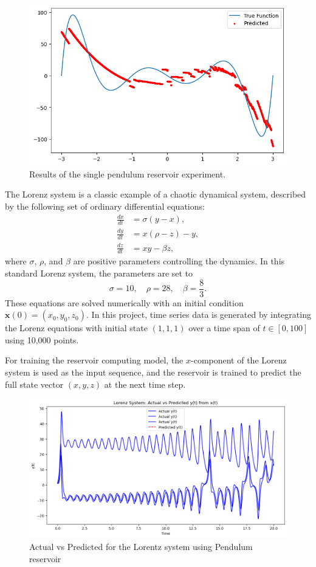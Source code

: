 \documentclass[numbered]{ivt-style/standard}
\begin{document}
\begin{figure}[H]
    \centering
    \includegraphics[width=0.75\linewidth]{figures/pendulum_result_0.png}
    \caption{Results of the single pendulum reservoir experiment.}
    \label{fig:pendulum-1}
\end{figure}

The Lorenz system is a classic example of a chaotic dynamical system, described by the following set of ordinary differential equations:
\begin{equation}
\begin{aligned}
\frac{dx}{dt} &= \sigma (y - x), \\
\frac{dy}{dt} &= x (\rho - z) - y, \\
\frac{dz}{dt} &= x y - \beta z,
\end{aligned}
\label{eq:lorenz}
\end{equation}
where $\sigma$, $\rho$, and $\beta$ are positive parameters controlling the dynamics. In this standard Lorenz system, the parameters are set to
\[
\sigma = 10, \quad \rho = 28, \quad \beta = \frac{8}{3}.
\]
These equations are solved numerically with an initial condition $\mathbf{x}(0) = (x_0, y_0, z_0)$. In this project, time series data is generated by integrating the Lorenz equations with initial state $(1, 1, 1)$ over a time span of $t \in [0, 100]$ using 10,000 points.

For training the reservoir computing model, the $x$-component of the Lorenz system is used as the input sequence, and the reservoir is trained to predict the full state vector $(x, y, z)$ at the next time step.

\begin{figure}[H]
    \centering
    \includegraphics[width=1\linewidth]{figures/lorentz_pendulum_1.png}
    \caption{Actual vs Predicted for the Lorentz system using Pendulum reservoir}
    \label{fig:lorentz_1}
\end{figure}
\end{document}
